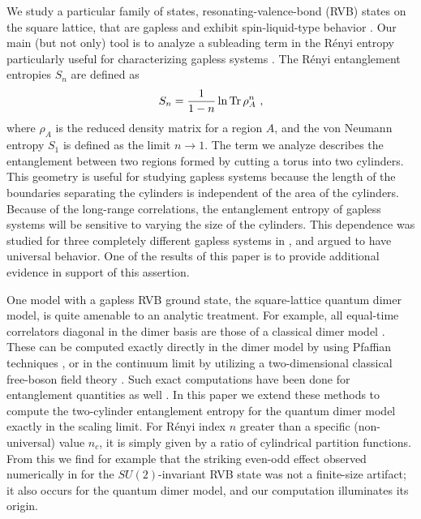 \documentclass[11pt]{iopart}
\begin{document}
We study a particular family of states, resonating-valence-bond (RVB) states on the square lattice, that are gapless and exhibit spin-liquid-type behavior \cite{RokhsarKivelson,RVB1,RVB2}. Our main (but not only) tool is to analyze a subleading term in the R\'enyi entropy particularly useful for characterizing gapless systems \cite{Ju2012}. The R\'enyi entanglement entropies $S_n$ are defined as
\begin{equation}
S_n=\frac{1}{1-n} \ln {\rm Tr}\, \rho_A^n\ , \label{RenyiEq}
\end{equation}
where $\rho_A$ is the reduced density matrix for a region $A$, and the von Neumann entropy $S_1$ is defined as the limit $n\to 1$.
The term we analyze describes the entanglement between two regions formed by cutting a torus into two cylinders. This geometry is useful for studying gapless systems
because the length of the boundaries separating the cylinders is independent of the area of the cylinders. Because of the long-range correlations, the entanglement
entropy of gapless systems will be sensitive to varying the size of the cylinders. 
This dependence was studied for three completely different gapless systems in \cite{Ju2012}, and argued to have universal behavior. One of the results of this paper is to provide additional evidence in support of this assertion.

One model with a gapless RVB ground state, the square-lattice quantum dimer model, is quite amenable to an analytic treatment. For example, all equal-time correlators diagonal in the dimer basis are those of a classical dimer model \cite{RokhsarKivelson}. These can be computed exactly directly in the dimer model by using Pfaffian techniques \cite{Kasteleyn,Fisher,FisherStephenson}, or in the continuum limit by utilizing a two-dimensional classical free-boson field theory \cite{Fradkinbook,Henley}. Such exact computations have been done for entanglement quantities as well \cite{FradkinMoore,Hsu2009,Shannonee,Oshikawa,Zaletel,Stephan2011}. In this paper we extend these methods to compute the two-cylinder entanglement entropy for the quantum dimer model exactly in the scaling limit. For R\'enyi index $n$ greater than a specific (non-universal) value $n_c$, it is simply given by a ratio of cylindrical partition functions. From this we find for example that the striking even-odd effect 
observed numerically in \cite{Ju2012} for 
the $SU(2)$-invariant RVB state was not a finite-size artifact; it also occurs for the quantum dimer model, and our computation illuminates its origin.
\end{document}

